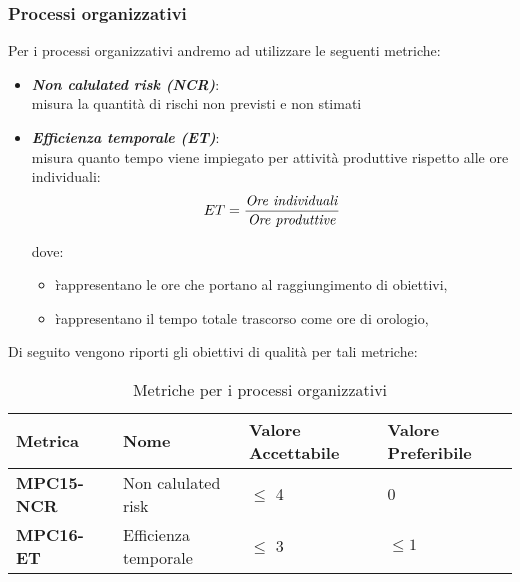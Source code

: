 \subsubsection{Processi organizzativi}
Per i processi organizzativi andremo ad utilizzare le seguenti metriche:
\begin{itemize}
    \item \textbf{\emph{Non calulated risk (NCR)}}:\\
    misura la quantità di rischi non previsti e non stimati
    \item \textbf{\emph{Efficienza temporale (ET)}}:\\
    misura quanto tempo viene impiegato per attività produttive rispetto alle ore individuali:
    \[
    ET = \frac{\text{\emph{Ore individuali}}}{\text{\emph{{Ore produttive}}}}
    \]

    dove:
    \begin{itemize}
        \item {} \`rappresentano le ore che portano al raggiungimento di obiettivi,
        \item {} \`rappresentano il tempo totale trascorso come ore di orologio,
    \end{itemize}
    \end{itemize}
Di seguito vengono riporti gli obiettivi di qualità per tali metriche:
\begin{table}[htbp]
    \centering
    \begin{tabular}{|>{\centering\arraybackslash}p{4cm}|p{4cm}|p{4cm}|p{4cm}|}
    \hline
    \rowcolor{gray!30}
    \textbf{Metrica} & \textbf{Nome} & \textbf{Valore Accettabile} & \textbf{Valore Preferibile} \\
    \hline
    \rowcolor{gray!10}
    \textbf{MPC15-NCR} & Non calulated risk & $\leq$ 4 & 0 \\
    \hline
    \textbf{MPC16-ET} & Efficienza temporale & $\leq$ 3 & $\leq 1$ \\
    \hline
    \end{tabular}
    \caption{Metriche per i processi organizzativi}
    \label{tab:metriche_fornitura}
\end{table}


